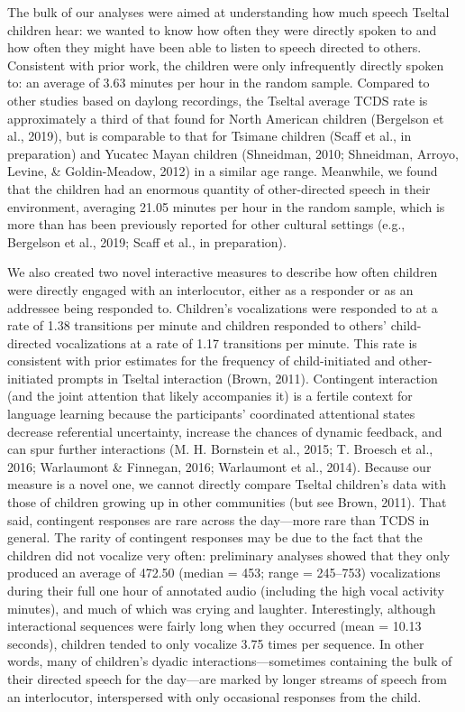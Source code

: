 \documentclass[floatsintext,man]{apa6}
\theoremstyle{definition}
\theoremstyle{definition}
\theoremstyle{definition}
\theoremstyle{remark}
\begin{document}
The bulk of our analyses were aimed at understanding how much speech
Tseltal children hear: we wanted to know how often they were directly
spoken to and how often they might have been able to listen to speech
directed to others. Consistent with prior work, the children were only
infrequently directly spoken to: an average of 3.63 minutes per hour in
the random sample. Compared to other studies based on daylong
recordings, the Tseltal average TCDS rate is approximately a third of
that found for North American children (Bergelson et al., 2019), but is
comparable to that for Tsimane children (Scaff et al., in preparation)
and Yucatec Mayan children (Shneidman, 2010; Shneidman, Arroyo, Levine,
\& Goldin-Meadow, 2012) in a similar age range. Meanwhile, we found that
the children had an enormous quantity of other-directed speech in their
environment, averaging 21.05 minutes per hour in the random sample,
which is more than has been previously reported for other cultural
settings (e.g., Bergelson et al., 2019; Scaff et al., in preparation).

We also created two novel interactive measures to describe how often
children were directly engaged with an interlocutor, either as a
responder or as an addressee being responded to. Children's
vocalizations were responded to at a rate of 1.38 transitions per minute
and children responded to others' child-directed vocalizations at a rate
of 1.17 transitions per minute. This rate is consistent with prior
estimates for the frequency of child-initiated and other-initiated
prompts in Tseltal interaction (Brown, 2011). Contingent interaction
(and the joint attention that likely accompanies it) is a fertile
context for language learning because the participants' coordinated
attentional states decrease referential uncertainty, increase the
chances of dynamic feedback, and can spur further interactions (M. H.
Bornstein et al., 2015; T. Broesch et al., 2016; Warlaumont \& Finnegan,
2016; Warlaumont et al., 2014). Because our measure is a novel one, we
cannot directly compare Tseltal children's data with those of children
growing up in other communities (but see Brown, 2011). That said,
contingent responses are rare across the day---more rare than TCDS in
general. The rarity of contingent responses may be due to the fact that
the children did not vocalize very often: preliminary analyses showed
that they only produced an average of 472.50 (median = 453; range =
245--753) vocalizations during their full one hour of annotated audio
(including the high vocal activity minutes), and much of which was
crying and laughter. Interestingly, although interactional sequences
were fairly long when they occurred (mean = 10.13 seconds), children
tended to only vocalize 3.75 times per sequence. In other words, many of
children's dyadic interactions---sometimes containing the bulk of their
directed speech for the day---are marked by longer streams of speech
from an interlocutor, interspersed with only occasional responses from
the child.
\end{document}
